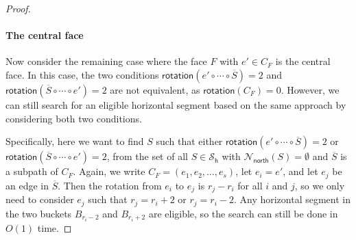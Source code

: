 \documentclass{theoretics}
\newcommand{\PH}{\mathcal{S}_\mathsf{h}}
\newcommand{\Nnorth}{\mathcal{N}_\mathsf{north}}
\newcommand{\rotation}{\mathsf{rotation}}
\begin{document}
\begin{proof}
 
 
 
   \paragraph{The central face} Now consider the remaining case where the face $F$ with $e' \in C_F$ is the central face. 
   In this case, the two conditions $\rotation(e' \circ \cdots \circ \overline{S}) = 2$ and  $\rotation(\overline{S} \circ \cdots \circ e') = 2$ are not equivalent, as $\rotation(C_F) = 0$. However, we can still search for an eligible horizontal segment based on the same approach by considering both two conditions. 
   
   Specifically, here   we want to find $S$ such that either  $\rotation(e' \circ \cdots \circ \overline{S}) = 2$ or $\rotation(\overline{S} \circ \cdots \circ e') = 2$, from the  set of all $S \in \PH$ with $\Nnorth(S) = \emptyset$ and $\overline{S}$ is a subpath of $C_F$. Again, we write $C_F=(e_1, e_2, \ldots, e_s)$, let $e_i  = e'$, and let $e_j$ be an edge in $\overline{S}$. Then the rotation  from $e_i$ to $e_j$ is $r_j - r_i$ for all $i$ and $j$, so  we only need to consider $e_j$ such that 
 $r_j = r_i + 2$ or $r_j  = r_i -2$. Any horizontal segment in the two buckets $B_{r_i-2}$ and $B_{r_i+2}$ are eligible, so the search can still be done in $O(1)$ time. 
 

\end{proof}
\end{document}
